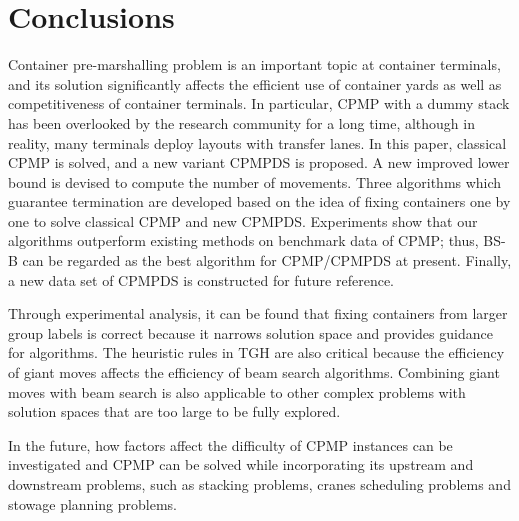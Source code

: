 \documentclass[review,3p,times,authoryear,12pt]{elsarticle}
\begin{document}
\section{Conclusions}
\label{sec:con}
Container pre-marshalling problem is an important topic at container terminals, and its solution significantly affects the efficient use of container yards as well as competitiveness of container terminals. In particular, CPMP with a dummy stack has been overlooked by the research community for a long time, although in reality, many terminals deploy layouts with transfer lanes.
In this paper, classical CPMP is solved, and a new variant CPMPDS is proposed. A new improved lower bound is devised to compute the number of movements. Three algorithms which guarantee termination are developed based on the idea of fixing containers one by one to solve classical CPMP and new CPMPDS. Experiments show that our algorithms outperform existing methods on benchmark data of CPMP; thus, BS-B can be regarded as the best algorithm for CPMP/CPMPDS at present.
Finally, a new data set of CPMPDS is constructed for future reference.

Through experimental analysis, it can be found that fixing containers from larger group labels is correct because it narrows solution space and provides guidance for algorithms. The heuristic rules in TGH are also critical because the efficiency of giant moves affects the efficiency of beam search algorithms. Combining giant moves with beam search is also applicable to other complex problems with solution spaces that are too large to be fully explored.

In the future, how factors affect the difficulty of CPMP instances can be investigated and CPMP can be solved while incorporating its upstream and downstream problems, such as stacking problems, cranes scheduling problems and stowage planning problems.






\end{document}
